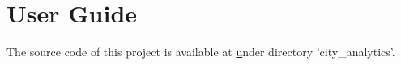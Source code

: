 \section{User Guide}
The source code of this project is available at \href{https://github.com/nxv1987/UniMelb---Cluster-and-Cloud-Computing-COMP90024-2020-SM1} under directory 'city_analytics'.

